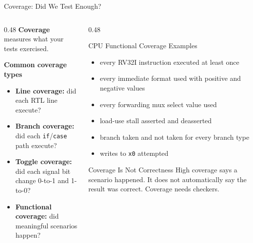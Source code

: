 \documentclass[aspectratio=169,10pt]{beamer}
\begin{document}
\begin{frame}{Coverage: Did We Test Enough?}
  \begin{columns}[T]
    \begin{column}{0.48\textwidth}
      \textbf{Coverage} measures what your tests exercised.

      \vspace{0.7em}
      \textbf{Common coverage types}
      \begin{itemize}
        \item \textbf{Line coverage:} did each RTL line execute?
        \item \textbf{Branch coverage:} did each \texttt{if}/\texttt{case} path execute?
        \item \textbf{Toggle coverage:} did each signal bit change 0-to-1 and 1-to-0?
        \item \textbf{Functional coverage:} did meaningful scenarios happen?
      \end{itemize}
    \end{column}
    \begin{column}{0.48\textwidth}
      \begin{block}{CPU Functional Coverage Examples}
        \begin{itemize}\small
          \item every RV32I instruction executed at least once
          \item every immediate format used with positive and negative values
          \item every forwarding mux select value used
          \item load-use stall asserted and deasserted
          \item branch taken and not taken for every branch type
          \item writes to \texttt{x0} attempted
        \end{itemize}
      \end{block}

      \vspace{0.5em}
      \begin{alertblock}{Coverage Is Not Correctness}
        High coverage says a scenario happened. It does not automatically say the result was correct. Coverage needs checkers.
      \end{alertblock}
    \end{column}
  \end{columns}
\end{frame}
\end{document}
